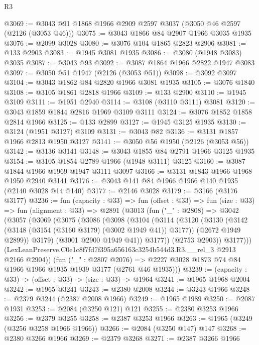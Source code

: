 \begin{lexlean}{R3}
\begin{coremodule}
@3069 := @3043 @91 @1868 @1966 @2909 @2597 @3037 (@3050 @46 @2597 (@2126 (@3053 @46)))
@3075 := @3043 @1866 @84 @2907 @1966 @3035 @1935
@3076 := @2099 @3028
@3080 := @3076 @104 @1865 @2823 @2906
@3081 := @133 @2903
@3083 := @1945 @3081 @1935
@3086 := @3080 (@1948 @3083) @3035
@3087 := @3043 @93
@3092 := @3087 @1864 @1966 @2822 @1947 @3083
@3097 := @3050 @51 @1947 (@2126 (@3053 @51))
@3098 := @3092 @3097
@3104 := @3043 @1862 @84 @2820 @1966 @3081 @1935
@3105 := @3076 @1840
@3108 := @3105 @1861 @2818 @1966
@3109 := @133 @2900
@3110 := @1945 @3109
@3111 := @1951 @2940
@3114 := @3108 (@3110 @3111) @3081
@3120 := @3043 @1859 @1844 @2816 @1969 @3109 @3111
@3124 := @3076 @1852 @1858 @2814 @1966
@3125 := @133 @2899
@3127 := @1945 @3125 @1935
@3130 := @3124 (@1951 @3127) @3109
@3131 := @3043 @82
@3136 := @3131 @1857 @1966 @2813 @1950 @3127
@3141 := @3050 @56 @1950 (@2126 (@3053 @56))
@3142 := @3136 @3141
@3148 := @3043 @1855 @84 @2791 @1966 @3125 @1935
@3154 := @3105 @1854 @2789 @1966 (@1948 @3111) @3125
@3160 := @3087 @1844 @1966 @1969 @1947 @3111 @3097
@3166 := @3131 @1843 @1966 @1968 @1950 @2940 @3141
@3176 := @3043 @141 @84 @1966 @1966 @140 @1935 (@2140 @3028 @14 @140)
@3177 := @2146 @3028
@3179 := @3166 (@3176 @3177)
@3236 := fun (capacity : @33) =>
  fun (offset : @33) =>
  fun (size : @33) =>
  fun (alignment : @33) =>
  @2891
    (@3013
      (fun ("_" : @2808) =>
      @3042
        (@3057
          (@3069
            (@3075
              (@3086
                (@3098
                  (@3104
                    (@3114
                      (@3120
                        (@3130
                          (@3142 (@3148 (@3154 (@3160 @3179) (@3002 @1949 @41)) @3177))
                          (@2672 @1949 @2899))
                        @3179)
                      (@3001 @2900 @1949 @41))
                    @3177))
                (@2753 @2903))
              @3177)))
        (LexLeanPreserve.C0e1c8f7fd7f395a656163c3254b544d3.R3.__rel_3 @2913 @2166 @2904))
      (fun ("_" : @2807 @2076) =>
      @2227 @3028 @1873 @74 @84 @1966 @1966 @1935 @1939 @3177 (@2761 @46 @1935)))
@3239 := (capacity : @33) -> (offset : @33) -> (size : @33) -> @1964
@3241 := @1965 @1968 @2004
@3242 := @1965 @3241
@3243 := @2380 @2008
@3244 := @3243 @1966
@3248 := @2379 @3244 (@2387 @2008 @1966)
@3249 := @1965 @1989
@3250 := @2087 @1931
@3253 := @2084 (@3250 @121) @121
@3255 := @2380 @3253 @1966
@3256 := @2379 @3255
@3258 := @2387 @3253 @1966
@3263 := @1965 (@3249 (@3256 @3258 @1966 @1966))
@3266 := @2084 (@3250 @147) @147
@3268 := @2380 @3266 @1966
@3269 := @2379 @3268
@3271 := @2387 @3266 @1966

\end{coremodule}
\end{lexlean}
